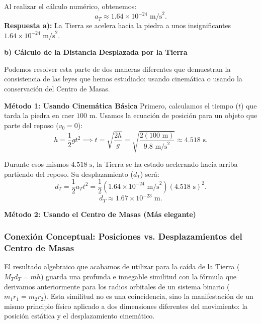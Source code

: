 \documentclass[11pt,a4paper]{book}
\begin{document}
Al realizar el cálculo numérico, obtenemos:
\begin{equation}
    a_T \approx 1.64 \times 10^{-24} \text{ m/s}^2.
\end{equation}
\textbf{Respuesta a):} La Tierra se acelera hacia la piedra a unos insignificantes $1.64 \times 10^{-24} \text{ m/s}^2$.

\vspace{0.5cm}

\textbf{b) Cálculo de la Distancia Desplazada por la Tierra}

Podemos resolver esta parte de dos maneras diferentes que demuestran la consistencia de las leyes que hemos estudiado: usando cinemática o usando la conservación del Centro de Masas.

\textbf{Método 1: Usando Cinemática Básica}
Primero, calculamos el tiempo ($t$) que tarda la piedra en caer $100 \text{ m}$. Usamos la ecuación de posición para un objeto que parte del reposo ($v_{0} = 0$):
\begin{equation}
    h = \frac{1}{2} g t^2 \implies t = \sqrt{\frac{2h}{g}} = \sqrt{\frac{2(100 \text{ m})}{9.8 \text{ m/s}^2}} \approx 4.518 \text{ s}.
\end{equation}

Durante esos mismos $4.518 \text{ s}$, la Tierra se ha estado acelerando hacia arriba partiendo del reposo. Su desplazamiento ($d_T$) será:
\begin{equation}
    d_T = \frac{1}{2} a_T t^2 = \frac{1}{2} (1.64 \times 10^{-24} \text{ m/s}^2) (4.518 \text{ s})^2.
\end{equation}
\begin{equation}
    d_T \approx 1.67 \times 10^{-23} \text{ m}.
\end{equation}

\textbf{Método 2: Usando el Centro de Masas (Más elegante)}
\subsubsection{Conexión Conceptual: Posiciones vs. Desplazamientos del Centro de Masas}

El resultado algebraico que acabamos de utilizar para la caída de la Tierra ($M_T d_T = m h$) guarda una profunda e innegable similitud con la fórmula que derivamos anteriormente para los radios orbitales de un sistema binario ($m_1 r_1 = m_2 r_2$). Esta similitud no es una coincidencia, sino la manifestación de un mismo principio físico aplicado a dos dimensiones diferentes del movimiento: la posición estática y el desplazamiento cinemático.
\end{document}
